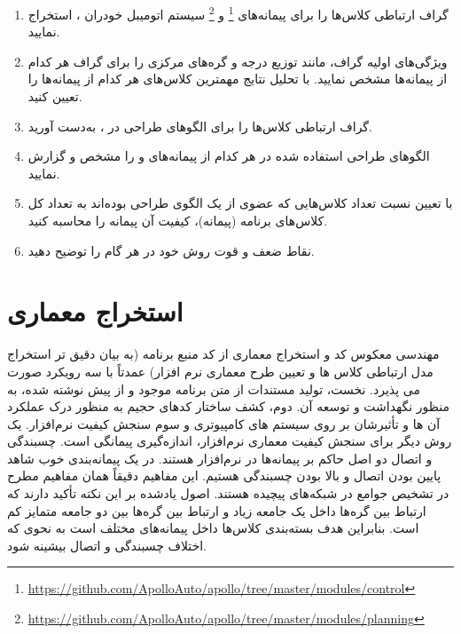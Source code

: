 \documentclass[a4paper,12pt]{article}
\begin{document}
\begin{enumerate}
	\item{
	گراف ارتباطی کلاس‌ها را برای پیمانه‌های
	 \footnote{\href{https://github.com/ApolloAuto/apollo/tree/master/modules/control}{https://github.com/ApolloAuto/apollo/tree/master/modules/control}}
 و 
 \footnote{\href{https://github.com/ApolloAuto/apollo/tree/master/modules/planning}{https://github.com/ApolloAuto/apollo/tree/master/modules/planning}}
 سیستم اتومیبل خودران 
  \cite{Apollo2020}،
 استخراج نمایید.
	}

\item{
ویژگی‌های اولیه گراف، مانند توزیع درجه و گره‌های مرکزی را برای گراف هر کدام از پیمانه‌ها مشخص نمایید. با تحلیل نتایج مهمترین کلاس‌های هر کدام از پیمانه‌ها را تعیین کنید.

}

\item{
	گراف ارتباطی کلاس‌ها را برای الگوهای طراحی در \cite{RefactoringGuru2020}، به‌دست آورید.
	
}

\item{
	الگوهای طراحی استفاده شده در هر کدام از پیمانه‌های 
	و 
	را مشخص و گزارش نمایید.
}

\item{
	با تعیین نسبت تعداد کلاس‌هایی که عضوی از یک الگوی طراحی بوده‌اند به تعداد کل کلاس‌های برنامه (پیمانه)، کیفیت آن پیمانه را محاسبه کنید.
}

\item{
	نقاط ضعف و قوت روش خود در هر گام را توضیح دهید.
}
 
 
\end{enumerate}


\section{استخراج معماری}\label{sec:extract-architecture}
مهندسی معکوس کد و استخراج معماری از کد منبع برنامه (به بیان دقیق تر استخراج مدل ارتباطی کلاس ها و تعیین طرح معماری نرم افزار) عمدتاً با سه رویکرد صورت می پذیرد. نخست، تولید مستندات از متن برنامه موجود و از پیش نوشته شده، به منظور نگهداشت و توسعه آن. دوم، کشف ساختار کدهای حجیم به منظور درک عملکرد آن ها و تأثیرشان بر روی سیستم های کامپیوتری و سوم سنجش کیفیت نرم‌افزار. یک روش دیگر برای سنجش کیفیت معماری نرم‌افزار، اندازه‌گیری پیمانگی
 است. چسبندگی 
 و اتصال 
 دو اصل حاکم بر پیمانه‌ها در نرم‌افزار هستند. در یک پیمانه‌بندی خوب شاهد پایین بودن اتصال و بالا بودن چسبندگی هستیم. این مفاهیم دقیقاً همان مفاهیم مطرح در تشخیص جوامع در شبکه‌های پیچیده هستند. اصول یادشده بر این نکته تأکید دارند که ارتباط بین گره‌ها داخل یک جامعه زیاد و ارتباط بین گره‌ها بین دو جامعه متمایز کم است. بنابراین هدف بسته‌بندی کلاس‌ها داخل پیمانه‌های مختلف است به نحوی که اختلاف چسبندگی و اتصال بیشینه شود.
 
\end{document}
